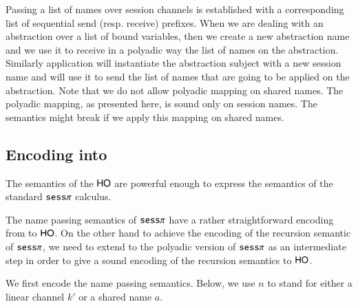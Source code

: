 Passing a list of names over session channels is established
with a corresponding list of sequential send (resp. receive) prefixes.
When we are dealing with an abstraction over a list of bound variables,
then we create a new abstraction name and we use it to receive in a polyadic
way the list of names on the abstraction. Similarly application will instantiate
the abstraction subject with a new session name and will use it 
to send the list of names that are going to be applied on the abstraction.
Note that we do not allow polyadic mapping on shared names.
The polyadic mapping, as presented here, is sound only on session names.
The semantics might break if we apply this mapping on shared names.



\subsection{Encoding \sespnr  into \HO}

The semantics of the $\mathsf{HO}$ are powerful enough to
express the semantics of the standard $\mathtt{sess}\pi$ calculus.

The name passing semantics of $\mathtt{sess}\pi$ have a rather straightforward
encoding from to $\mathsf{HO}$.
On the other hand to achieve the encoding of the recursion semantic
of $\mathtt{sess}\pi$, we need to extend
to the polyadic version of $\mathtt{sess}\pi$ as an intermediate step in order
to give a sound encoding of the recursion semantics to $\mathsf{HO}$.

We first encode the name passing semantics. Below, we use $n$ to stand for either a linear channel $k'$ or a shared name $a$.

